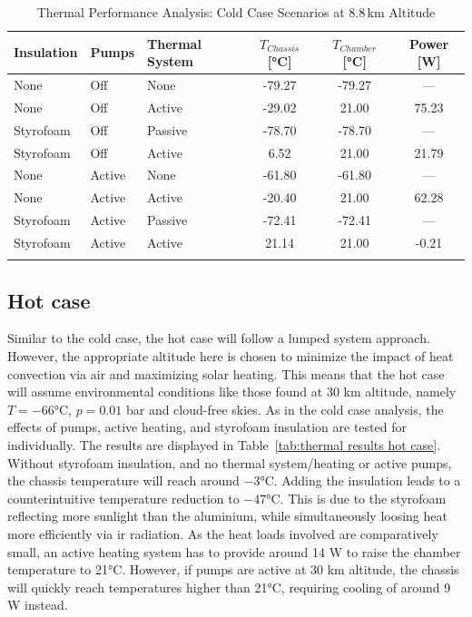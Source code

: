 \documentclass[
  a4paper,
  11pt,
  openany,
  parskip,
  toc=totoc,
  listof=totoc,
  bibliography=totoc
]{scrreprt}
\newcommand{\tref}[1]{Table~\ref{#1}}
\begin{document}
\begin{table}[H]
\centering
\caption{Thermal Performance Analysis: Cold Case Scenarios at 8.8\,km Altitude}
\label{tab:thermal results cold case}
\begin{tabular}{@{}lll S[table-format=-2.2] S[table-format=-2.2] S[table-format=-2.2]@{}}
\toprule
\textbf{Insulation} & \textbf{Pumps} & \textbf{Thermal System} & {$T_{Chassis}$ [\si{\celsius}]} & {$T_{Chamber}$ [\si{\celsius}]} & {Power [\si{W}]} \\ \midrule
None & Off & None & -79.27 & -79.27 & {---} \\
None & Off & Active & -29.02 & 21.00 & 75.23 \\ 
Styrofoam & Off & Passive & -78.70 & -78.70 & {---} \\
Styrofoam & Off & Active & 6.52 & 21.00 & 21.79 \\ \midrule
None & Active & None & -61.80 & -61.80 & {---} \\
None & Active & Active & -20.40 & 21.00 & 62.28 \\ 
Styrofoam & Active & Passive & -72.41 & -72.41 & {---} \\
Styrofoam & Active & Active & 21.14 & 21.00 & -0.21 \\ \bottomrule
\addlinespace
{}
\end{tabular}
\end{table}

\subsection{Hot case}\label{sec: thermal hot case}
Similar to the cold case, the hot case will follow a lumped system approach. However, the appropriate altitude here is chosen to minimize the impact of heat convection via air and maximizing solar heating. This means that the hot case will assume environmental conditions like those found at 30 km altitude, namely $T=-66$°C, $p=0.01$ bar and cloud-free skies. As in the cold case analysis, the effects of pumps, active heating, and styrofoam insulation are tested for individually. The results are displayed in \tref{tab:thermal results hot case}. Without styrofoam insulation, and no thermal system/heating or active pumps, the chassis temperature will reach around $-3$°C. 
Adding the insulation leads to a counterintuitive temperature reduction to $-47$°C. This is due to the styrofoam reflecting more sunlight than the aluminium, while simultaneously loosing heat more efficiently via \gls{ir} radiation. 
As the heat loads involved are comparatively small, an active heating system has to provide around 14 W to raise the chamber temperature to 21°C. However, if pumps are active at 30 km altitude, the chassis will quickly reach temperatures higher than 21°C, requiring cooling of around 9 W instead.\par 
\end{document}

